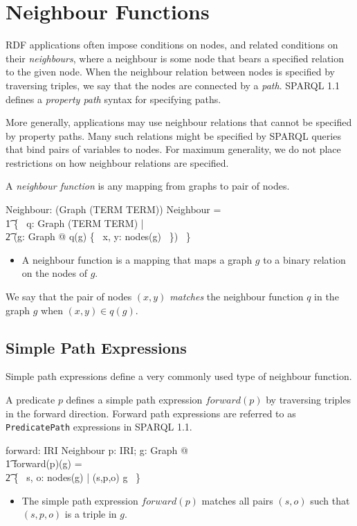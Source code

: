 \documentclass{article}
\begin{document}
\section{Neighbour Functions}
\label{sec-neighbours}

RDF applications often impose conditions on nodes, and related conditions on their {\em neighbours},
where a neighbour is some node that bears a specified relation to the given node.
When the neighbour relation between nodes is specified by traversing triples, we say that the nodes
are connected by a {\em path}. 
SPARQL 1.1\cite{w3c:sparql11} defines a {\em property path} syntax for specifying paths. 

More generally, applications may use neighbour relations that cannot be specified by property paths.
Many such relations might be specified by SPARQL queries that bind pairs of variables to nodes.
For maximum generality, we do not place restrictions on how neighbour relations are specified.

A {\em neighbour function} is any mapping from graphs to pair of nodes.
\begin{axdef}
	Neighbour: \power (Graph \fun (TERM \rel TERM))
\where
	Neighbour = \\
\t1		\{~ q: Graph \fun (TERM \rel TERM) | \\
\t2			(\forall g: Graph @ q(g) \subseteq \{~ x, y: nodes(g) ~\}) ~\}
\end{axdef}
\begin{itemize}
\item A neighbour function is a mapping that maps a graph $g$ to a binary relation on the nodes of $g$.
\end{itemize}

We say that the pair of nodes $(x,y)$ {\em matches} the neighbour function $q$ in the graph $g$ when $(x,y) \in q(g)$.

\subsection{Simple Path Expressions}

Simple path expressions define a very commonly used type of neighbour function.

A predicate $p$ defines a simple path expression $forward(p)$ by traversing triples in the forward direction.
Forward path expressions are referred to as {\tt PredicatePath} expressions in SPARQL 1.1.
\begin{axdef}
	forward: IRI \fun Neighbour
\where
	\forall p: IRI; g: Graph @ \\
\t1		forward(p)(g) = \\
\t2			\{~ s, o: nodes(g) | (s,p,o) \in g ~\}
\end{axdef}
\begin{itemize}
\item The simple path expression $forward(p)$ matches all pairs $(s,o)$ such that $(s,p,o)$ is a triple in $g$.
\end{itemize}
\end{document}
